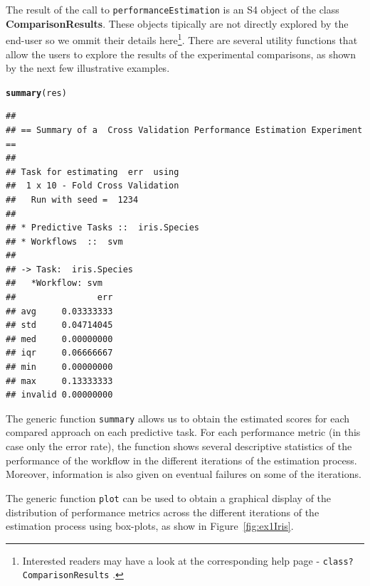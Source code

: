 \documentclass[10pt,a4paper]{article}\usepackage[]{graphicx}\usepackage[]{color}
\makeatletter
\newcommand{\hlstd}[1]{\textcolor[rgb]{0.345,0.345,0.345}{#1}}%
\newcommand{\hlkwd}[1]{\textcolor[rgb]{0.737,0.353,0.396}{\textbf{#1}}}%
\newenvironment{kframe}{%
 \def\at@end@of@kframe{}%
 \ifinner\ifhmode%
  \def\at@end@of@kframe{\end{minipage}}%
  \begin{minipage}{\columnwidth}%
 \fi\fi%
 \def\FrameCommand##1{\hskip\@totalleftmargin \hskip-\fboxsep
 \colorbox{shadecolor}{##1}\hskip-\fboxsep
     \hskip-\linewidth \hskip-\@totalleftmargin \hskip\columnwidth}%
 \MakeFramed {\advance\hsize-\width
   \@totalleftmargin\z@ \linewidth\hsize
   \@setminipage}}%
 {\par\unskip\endMakeFramed%
 \at@end@of@kframe}
\newenvironment{knitrout}{}{} %
\makeatother
\begin{document}
The result of the call to \texttt{performanceEstimation} is an S4
object of the class \textbf{ComparisonResults}. These objects tipically are not
 directly explored by the end-user so we ommit their
details here\footnote{Interested readers may have a look at the corresponding
  help page - \texttt{class?ComparisonResults} .}. There are several utility
functions that allow the users to explore the results of the
experimental comparisons, as shown by the next few illustrative examples.




\begin{knitrout}\footnotesize
{}\color{fgcolor}\begin{kframe}
\begin{alltt}
\hlkwd{summary}\hlstd{(res)}
\end{alltt}
\begin{verbatim}
## 
## == Summary of a  Cross Validation Performance Estimation Experiment ==
## 
## Task for estimating  err  using
##  1 x 10 - Fold Cross Validation
## 	 Run with seed =  1234 
## 
## * Predictive Tasks ::  iris.Species
## * Workflows  ::  svm 
## 
## -> Task:  iris.Species
##   *Workflow: svm 
##                err
## avg     0.03333333
## std     0.04714045
## med     0.00000000
## iqr     0.06666667
## min     0.00000000
## max     0.13333333
## invalid 0.00000000
\end{verbatim}
\end{kframe}
\end{knitrout}

The generic function \texttt{summary} allows us to obtain the
estimated scores for each compared approach on each predictive
task. For each performance metric (in this case only the error rate),
the function shows several descriptive statistics of the performance of the workflow in the different iterations of the estimation process. Moreover,
information is also given on eventual failures on some of the
iterations.



The generic function \texttt{plot} can be used to obtain a graphical
display of the distribution of performance metrics across the
different iterations of the estimation process using box-plots, as
show in Figure~\ref{fig:ex1Iris}. 
\end{document}
